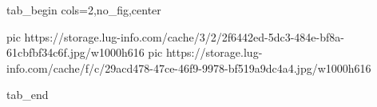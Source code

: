  
 
 
 
 


\ifcmt
  tab_begin cols=2,no_fig,center

     pic https://storage.lug-info.com/cache/3/2/2f6442ed-5dc3-484e-bf8a-61cbfbf34c6f.jpg/w1000h616%
     pic https://storage.lug-info.com/cache/f/c/29acd478-47ce-46f9-9978-bf519a9dc4a4.jpg/w1000h616%

  tab_end
\fi
